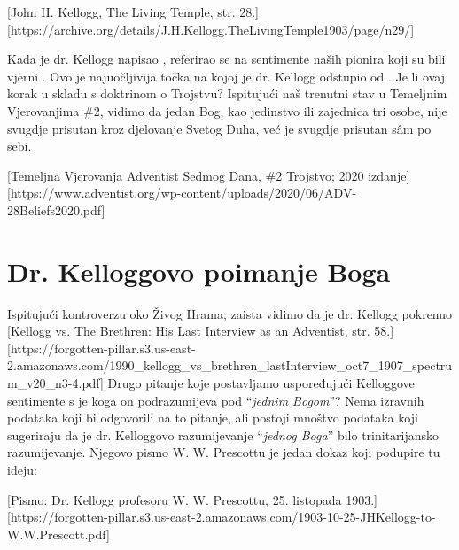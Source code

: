 [John H. Kellogg, The Living Temple, str. 28.][https://archive.org/details/J.H.Kellogg.TheLivingTemple1903/page/n29/]

Kada je dr. Kellogg napisao , referirao se na sentimente naših pionira koji su bili vjerni . Ovo je najuočljivija točka na kojoj je dr. Kellogg odstupio od . Je li ovaj korak u skladu s doktrinom o Trojstvu? Ispitujući naš trenutni stav u Temeljnim Vjerovanjima \#2, vidimo da jedan Bog, kao jedinstvo ili zajednica tri osobe, nije svugdje prisutan kroz djelovanje Svetog Duha, već je svugdje prisutan sâm po sebi.

[Temeljna Vjerovanja Adventist Sedmog Dana, \#2 Trojstvo; 2020 izdanje][https://www.adventist.org/wp-content/uploads/2020/06/ADV-28Beliefs2020.pdf]

\section*{Dr. Kelloggovo poimanje Boga}

Ispitujući kontroverzu oko Živog Hrama, zaista vidimo da je dr. Kellogg pokrenuo [Kellogg vs. The Brethren: His Last Interview as an Adventist, str. 58.][https://forgotten-pillar.s3.us-east-2.amazonaws.com/1990\_kellogg\_vs\_brethren\_lastInterview\_oct7\_1907\_spectrum\_v20\_n3-4.pdf] Drugo pitanje koje postavljamo uspoređujući Kelloggove sentimente s  je koga on podrazumijeva pod “\textit{jednim Bogom}”? Nema izravnih podataka koji bi odgovorili na to pitanje, ali postoji mnoštvo podataka koji sugeriraju da je dr. Kelloggovo razumijevanje “\textit{jednog Boga}” bilo trinitarijansko razumijevanje. Njegovo pismo W. W. Prescottu je jedan dokaz koji podupire tu ideju:

[Pismo: Dr. Kellogg profesoru W. W. Prescottu, 25. listopada 1903.][https://forgotten-pillar.s3.us-east-2.amazonaws.com/1903-10-25-JHKellogg-to-W.W.Prescott.pdf]

